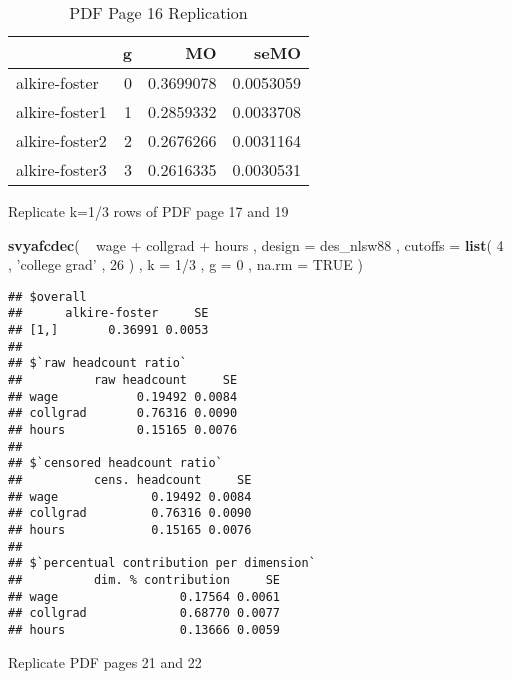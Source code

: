 \documentclass[]{book}
\newenvironment{Shaded}{\begin{snugshade}}{\end{snugshade}}
\newcommand{\KeywordTok}[1]{\textcolor[rgb]{0.13,0.29,0.53}{\textbf{{#1}}}}
\newcommand{\DataTypeTok}[1]{\textcolor[rgb]{0.13,0.29,0.53}{{#1}}}
\newcommand{\DecValTok}[1]{\textcolor[rgb]{0.00,0.00,0.81}{{#1}}}
\newcommand{\StringTok}[1]{\textcolor[rgb]{0.31,0.60,0.02}{{#1}}}
\newcommand{\OtherTok}[1]{\textcolor[rgb]{0.56,0.35,0.01}{{#1}}}
\newcommand{\NormalTok}[1]{{#1}}
\theoremstyle{definition}
\theoremstyle{definition}
\theoremstyle{remark}
\begin{document}
\begin{table}

\caption{\label{tab:unnamed-chunk-61}PDF Page 16 Replication}
\centering
\begin{tabular}[t]{lrrr}
\toprule
  & g & MO & seMO\\
\midrule
alkire-foster & 0 & 0.3699078 & 0.0053059\\
alkire-foster1 & 1 & 0.2859332 & 0.0033708\\
alkire-foster2 & 2 & 0.2676266 & 0.0031164\\
alkire-foster3 & 3 & 0.2616335 & 0.0030531\\
\bottomrule
\end{tabular}
\end{table}

Replicate k=1/3 rows of PDF page 17 and 19

\begin{Shaded}
\begin{Highlighting}[]
\KeywordTok{svyafcdec}\NormalTok{(}
    \NormalTok{~}\StringTok{ }\NormalTok{wage +}\StringTok{ }\NormalTok{collgrad +}\StringTok{ }\NormalTok{hours , }
    \DataTypeTok{design =} \NormalTok{des_nlsw88 , }
    \DataTypeTok{cutoffs =} \KeywordTok{list}\NormalTok{( }\DecValTok{4} \NormalTok{, }\StringTok{'college grad'} \NormalTok{, }\DecValTok{26} \NormalTok{) , }
    \DataTypeTok{k =} \DecValTok{1}\NormalTok{/}\DecValTok{3} \NormalTok{, }
    \DataTypeTok{g =} \DecValTok{0} \NormalTok{,}
    \DataTypeTok{na.rm =} \OtherTok{TRUE}
\NormalTok{)}
\end{Highlighting}
\end{Shaded}

\begin{verbatim}
## $overall
##      alkire-foster     SE
## [1,]       0.36991 0.0053
## 
## $`raw headcount ratio`
##          raw headcount     SE
## wage           0.19492 0.0084
## collgrad       0.76316 0.0090
## hours          0.15165 0.0076
## 
## $`censored headcount ratio`
##          cens. headcount     SE
## wage             0.19492 0.0084
## collgrad         0.76316 0.0090
## hours            0.15165 0.0076
## 
## $`percentual contribution per dimension`
##          dim. % contribution     SE
## wage                 0.17564 0.0061
## collgrad             0.68770 0.0077
## hours                0.13666 0.0059
\end{verbatim}

Replicate PDF pages 21 and 22
\end{document}
